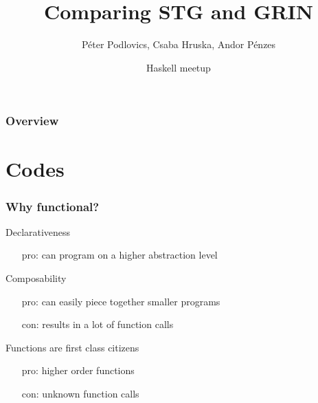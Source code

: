 \documentclass[bigger]{beamer}
\title[STG vs GRIN] %
{Comparing STG and GRIN}
\author[P. Podlovics, Cs. Hruska, Andor Pénzes ] %
{Péter Podlovics, Csaba Hruska, Andor Pénzes}
\institute[ELTE] %
{
	Eötvös Loránd University (ELTE), \\ Budapest, Hungary
}
\date{Haskell meetup} %
\begin{document}
{
	\frame{\vspace{15mm}\titlepage}
}

\begin{frame}
	\frametitle{Overview}
	\tableofcontents
\end{frame}

\section{Codes}

\begin{frame}[fragile]
\frametitle{Why functional?}

\begin{vfitemize}
	\item Declarativeness
	\begin{itemize}
		\item[pro:] can program on a higher abstraction level
	\end{itemize}
	\item Composability\\
	\begin{itemize}
		\item[pro:] can easily piece together smaller programs
		\item[con:] results in a lot of function calls
	\end{itemize}
	\item Functions are first class citizens
	\begin{itemize}
		\item[pro:] higher order functions
		\item[con:] unknown function calls
	\end{itemize}
\end{vfitemize}

\end{frame}
\end{document}
